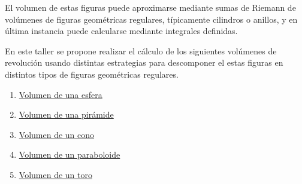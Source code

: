 \documentclass[
  a4paper,
]{scrreport}
\begin{document}
El volumen de estas figuras puede aproximarse mediante sumas de Riemann
de volúmenes de figuras geométricas regulares, típicamente cilindros o
anillos, y en última instancia puede calcularse mediante integrales
definidas.

En este taller se propone realizar el cálculo de los siguientes
volúmenes de revolución usando distintas estrategias para descomponer el
estas figuras en distintos tipos de figuras geométricas regulares.

\begin{enumerate}
\def\labelenumi{\alph{enumi}.}
\item
  \href{https://www.geogebra.org/m/nfdm8xjg}{Volumen de una esfera}
\item
  \href{https://www.geogebra.org/m/g2wu3tqw}{Volumen de una pirámide}
\item
  \href{https://www.geogebra.org/m/vfqyfuxx}{Volumen de un cono}
\item
  \href{https://www.geogebra.org/m/xugkcvn5}{Volumen de un paraboloide}
\item
  \href{https://www.geogebra.org/m/wy2uquqc}{Volumen de un toro}
\end{enumerate}
\end{document}
